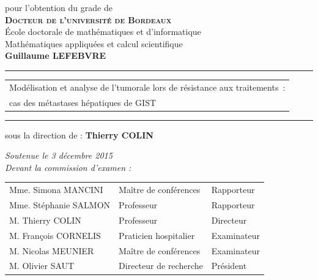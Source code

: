 \documentclass[a4paper,twoside,final]{book} %
\newcounter{hours}\newcounter{minutes}
\newcommand{\printtime}{%
  \setcounter{hours}{\time/60}%
  \setcounter{minutes}{\time-\value{hours}*60}%
  \thehours h\,\nplpadding{2}\numprint{\theminutes}\npnolpadding}
\theoremstyle{definition}
\newcommand{\shortitlefr}{Modélisation et analyse de l'\hetero tumorale lors de résistance aux traitements}
\newcommand{\subtitlefr}{cas des métastases hépatiques de GIST}
\newcommand{\titrefr}{\shortitlefr~: \subtitlefr}
\begin{document}
\begin{titlepage}
\begin{center}
  	\vspace{0.5cm}
   pour l'obtention du grade de\\
   	\vspace{0.5cm}
  \textbf{\textsc{\LARGE Docteur de l'université de Bordeaux}}\\
  	\vspace{0.5cm}
  {\Large École doctorale de mathématiques et d'informatique\\
  	Mathématiques appliquées et calcul scientifique}\\
  \vfill
  \textbf{\Large Guillaume LEFEBVRE}\\
  \vfill
  \hrule \vspace{0.5cm}
  \begin{tabular}{C{12cm}}
  \sc \Large \shortitlefr~: \vspace{1mm}\\ 
  \sc \large \subtitlefr  
  \end{tabular}
  \vspace{0.5cm}\hrule
\vfill
sous la direction de : \textbf{Thierry COLIN}
\end{center}
\vfill
\begin{flushleft}
\textit{Soutenue le 3 décembre 2015}\\ \vspace{5mm}
\textit{Devant la commission d'examen :}
\end{flushleft}
\vspace{-5mm}
\begin{center}\begin{tabular}{p{6cm} p{50mm} l}
 Mme. Simona MANCINI & Maître de conférences & Rapporteur \\
 Mme. Stéphanie SALMON & Professeur & Rapporteur \\
 M. Thierry COLIN & Professeur & Directeur \\
 M. Fran\c cois CORNELIS & Praticien hospitalier & Examinateur \\
 M. Nicolas MEUNIER & Maître de conférences & Examinateur \\
 M. Olivier SAUT & Directeur de recherche & Président\\
\end{tabular}\end{center}
\end{titlepage}

\end{document}

